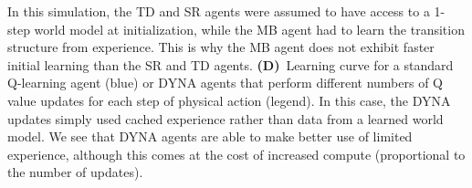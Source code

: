 \begin{figure*}[!t]
{        In this simulation, the TD and SR agents were assumed to have access to a 1-step world model at initialization, while the MB agent had to learn the transition structure from experience.
        This is why the MB agent does not exhibit faster initial learning than the SR and TD agents.
        {\bfseries (D)}~Learning curve for a standard Q-learning agent (blue) or DYNA agents that perform different numbers of Q value updates for each step of physical action (legend).
        In this case, the DYNA updates simply used cached experience rather than data from a learned world model.
        We see that DYNA agents are able to make better use of limited experience, although this comes at the cost of increased compute (proportional to the number of updates).
        }
    \vspace*{-1.0em}
\end{figure*}

